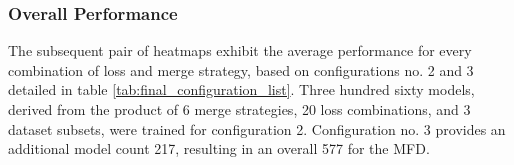 

\subsubsection*{Overall Performance}
\label{subsubsec:medaka_overall_performance}
The subsequent pair of heatmaps exhibit the average performance for every combination of loss and merge strategy, based on configurations no. 2 and 3 detailed in table \ref{tab:final_configuration_list}. Three hundred sixty models, derived from the product of 6 merge strategies, 20 loss combinations, and 3 dataset subsets, were trained for configuration 2. Configuration no. 3 provides an additional model count 217, resulting in an overall 577 for the \ac{MFD}.

